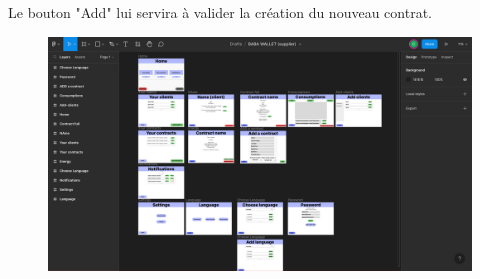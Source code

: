 \begin{flushleft}
Le bouton "Add" lui servira à valider la création du nouveau contrat.
\end{flushleft}

\begin{figure}
    \centering
    \includegraphics[width = 1\textwidth]{Base/interface/img/Supplier.pdf}
\end{figure}
